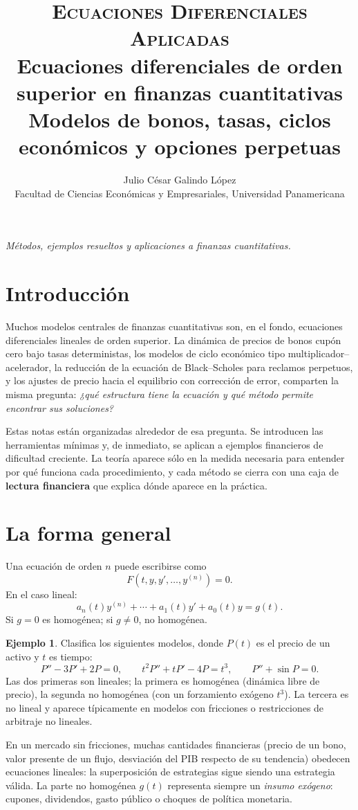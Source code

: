 \documentclass[11pt]{article}
\title{\textsc{\color{upblue}Ecuaciones Diferenciales Aplicadas}\\[4pt]
\Large Ecuaciones diferenciales de orden superior en finanzas cuantitativas\\[5pt]
\large Modelos de bonos, tasas, ciclos económicos y opciones perpetuas}
\author{Julio César Galindo López\\[2pt]\small Facultad de Ciencias Económicas y Empresariales, Universidad Panamericana}
\date{}
\theoremstyle{definition}
\newtheorem{ejemplo}[teorema]{Ejemplo}
\begin{document}
\maketitle
\begin{center}\emph{Métodos, ejemplos resueltos y aplicaciones a finanzas cuantitativas.}\end{center}

\section*{Introducción}
Muchos modelos centrales de finanzas cuantitativas son, en el fondo, ecuaciones diferenciales
lineales de orden superior. La dinámica de precios de bonos cupón cero bajo tasas
deterministas, los modelos de ciclo económico tipo multiplicador--acelerador, la
reducción de la ecuación de Black--Scholes para reclamos perpetuos, y los ajustes
de precio hacia el equilibrio con corrección de error, comparten la misma pregunta:
\emph{¿qué estructura tiene la ecuación y qué método permite encontrar sus soluciones?}

Estas notas están organizadas alrededor de esa pregunta. Se introducen las herramientas
mínimas y, de inmediato, se aplican a ejemplos financieros de dificultad creciente. La
teoría aparece sólo en la medida necesaria para entender por qué funciona cada
procedimiento, y cada método se cierra con una caja de \textbf{lectura financiera} que
explica dónde aparece en la práctica.

\tableofcontents

\section{La forma general}
Una ecuación de orden $n$ puede escribirse como
\[
F(t,y,y',\ldots,y^{(n)})=0.
\]
En el caso lineal:
\[
a_n(t)y^{(n)}+\cdots+a_1(t)y'+a_0(t)y=g(t).
\]
Si $g=0$ es homogénea; si $g\ne0$, no homogénea.

\begin{ejemplo}
Clasifica los siguientes modelos, donde $P(t)$ es el precio de un activo y $t$ es tiempo:
\[
P''-3P'+2P=0,\qquad t^2P''+tP'-4P=t^3,\qquad P''+\sin P=0.
\]
Las dos primeras son lineales; la primera es homogénea (dinámica libre de precio),
la segunda no homogénea (con un forzamiento exógeno $t^3$).
La tercera es no lineal y aparece típicamente en modelos con fricciones o restricciones
de arbitraje no lineales.
\end{ejemplo}

\begin{finanzas}
En un mercado sin fricciones, muchas cantidades financieras (precio de un bono, valor
presente de un flujo, desviación del PIB respecto de su tendencia) obedecen ecuaciones
lineales: la superposición de estrategias sigue siendo una estrategia válida. La parte
no homogénea $g(t)$ representa siempre un \emph{insumo exógeno}: cupones, dividendos,
gasto público o choques de política monetaria.
\end{finanzas}
\end{document}
